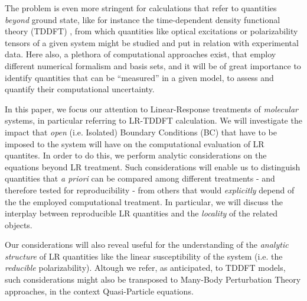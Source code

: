 \documentclass[reprint,aps,prb]{revtex4-1}
\begin{document}
The problem is even more stringent for calculations that refer to quantities \emph{beyond} ground state, like
for instance the time-dependent density functional theory (TDDFT) \cite{casida1995,runge1984,onida2002},
from which quantities like optical excitations or polarizability tensors
of a given system might be studied and put in relation with experimental data.
Here also, a plethora of computational approaches exist, that employ different numerical formalism and
basis sets, and it will be of great importance to identify quantities that can be ``measured'' in a given model, to assess
and quantify their computational uncertainty.

In this paper, we focus our attention to Linear-Response treatments of \emph{molecular} systems, 
in particular referring to LR-TDDFT calculation. We will investigate the impact that 
\emph{open} (i.e. Isolated) Boundary Conditions (BC) that have to be imposed to the system will have on the computational evaluation of LR quantites.
In order to do this, we perform analytic considerations on the equations beyond LR treatment.
Such considerations will enable us to distinguish quantities that \textit{a priori} can be compared among different treatments - and therefore tested for reproducibility - 
from others that would \emph{explicitly} depend of the the employed computational treatment. 
In particular, we will discuss the interplay between reproducible LR quantities and the \emph{locality} of the related objects.

Our considerations will also reveal useful for the understanding of the \emph{analytic structure} of LR quantities like
the linear susceptibility of the system (i.e. the \emph{reducible} polarizability).
Altough we refer, as anticipated, to TDDFT models, such considerations might also be transposed to Many-Body Perturbation Theory
approaches, in the context Quasi-Particle equations.

\end{document}
